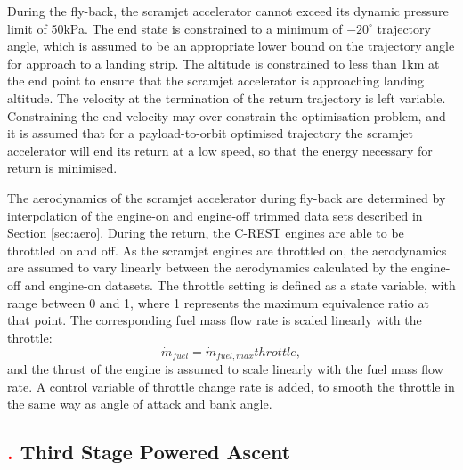 During the fly-back, the scramjet accelerator cannot exceed its dynamic pressure limit of 50kPa. 
 The end state is constrained to a minimum of $-20^\circ$ trajectory angle, which is assumed to be an appropriate lower bound on the trajectory angle for approach to a landing strip. The altitude is constrained to less than 1km at the end point to ensure that the scramjet accelerator is approaching landing altitude.
 The velocity at the termination of the return trajectory is left variable. Constraining the end velocity may over-constrain the optimisation problem, and it is assumed that for a payload-to-orbit optimised trajectory the scramjet accelerator will end its return at a low speed, so that the energy necessary for return is minimised. 
 
 
 
 The aerodynamics of the scramjet accelerator during fly-back are determined by interpolation of the engine-on and engine-off trimmed data sets described in Section \ref{sec:aero}.
During the return, the C-REST engines are able to be throttled on and off. 
 As the scramjet engines are throttled on, the aerodynamics are assumed to vary linearly between the aerodynamics calculated by the engine-off and engine-on datasets. 
The throttle setting is defined as a state variable, with range between 0 and 1, where 1 represents the maximum equivalence ratio at that point. The corresponding fuel mass flow rate is scaled linearly with the throttle:  
\begin{equation}
\dot{m}_{fuel} = \dot{m}_{fuel,max}throttle,
\end{equation}
and the thrust of the engine is assumed to scale linearly with the fuel mass flow rate. A control variable of throttle change rate is added, to smooth the throttle in the same way as angle of attack and bank angle. 

 

\subsection{\textcolor{red}{.} Third Stage Powered Ascent}



